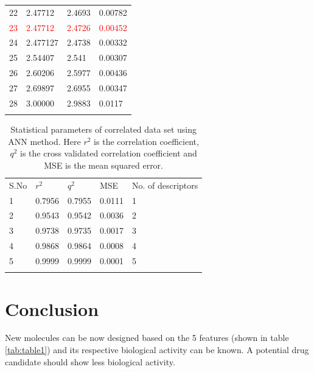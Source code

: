 \documentclass[twocolumn]{article}
\begin{document}
\begin{table}[htb]
\begin{tabular}{llll}
22 & 2.47712 & 2.4693 & 0.00782\\
\textcolor{red}{23} & \textcolor{red}{2.47712} &\textcolor{red}{2.4726} &
\textcolor{red}{0.00452}\\
24 & 2.477127 & 2.4738 & 0.00332\\
25 & 2.54407 & 2.541 & 0.00307 \\
26 & 2.60206 & 2.5977 & 0.00436\\
27 & 2.69897 & 2.6955 & 0.00347\\
28 & 3.00000 & 2.9883 & 0.0117\\
\noalign{\smallskip}\hline
\end{tabular}
\end{table}

\begin{table}[htb]
\caption{Statistical parameters of correlated data set using ANN method. Here
  $r^2$ is the correlation coefficient, $q^2$  is the cross validated
  correlation coefficient and MSE is the mean squared error.}
\label{tab:table3}
\begin{tabular}{lllll}
\hline\noalign{\smallskip}
S.No & $r^2$ & $q^2$ & MSE & No. of descriptors \\
\noalign{\smallskip}\hline\noalign{\smallskip}
1 &  0.7956 & 0.7955 & 0.0111 & 1\\
2 & 0.9543 & 0.9542 & 0.0036 & 2\\
3 & 0.9738 & 0.9735 & 0.0017 & 3\\
4 & 0.9868 & 0.9864 & 0.0008 & 4\\
5 & 0.9999 & 0.9999 & 0.0001 & 5\\
\noalign{\smallskip}\hline
\end{tabular}
\end{table}
\clearpage
\section{Conclusion}
New molecules can be now designed based on the 5 features (shown in table \ref{tab:table1}) and its respective biological activity can be known. A potential drug candidate should show less biological activity.
  
\end{document}
